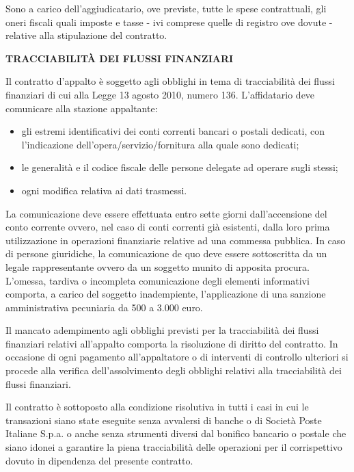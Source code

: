Sono a carico dell'aggiudicatario, ove previste, tutte le spese
contrattuali, gli oneri fiscali quali imposte e tasse - ivi comprese
quelle di registro ove dovute - relative alla stipulazione del contratto.

\textbf{TRACCIABILITÀ DEI FLUSSI FINANZIARI}

Il contratto d'appalto è soggetto agli obblighi in tema di
tracciabilità dei flussi finanziari di cui alla Legge 13 agosto 2010,
numero 136. L'affidatario deve comunicare alla stazione appaltante:

\begin{itemize}

\item gli estremi identificativi dei conti correnti bancari o postali
dedicati, con l'indicazione dell'opera/servizio/fornitura alla quale
sono dedicati;

\item le generalità e il codice fiscale delle persone delegate ad
operare sugli stessi;

\item ogni modifica relativa ai dati trasmessi. 
\end{itemize}

La comunicazione deve essere effettuata entro sette giorni dall'accensione
del conto corrente ovvero, nel caso di conti correnti già esistenti,
dalla loro prima utilizzazione in operazioni finanziarie relative ad
una commessa pubblica. In caso di persone giuridiche, la comunicazione
de quo deve essere sottoscritta da un legale rappresentante ovvero da
un soggetto munito di apposita procura. L'omessa, tardiva o incompleta
comunicazione degli elementi informativi comporta, a carico del soggetto
inadempiente, l'applicazione di una sanzione amministrativa pecuniaria
da 500 a 3.000 euro.

Il mancato adempimento agli obblighi previsti per la tracciabilità
dei flussi finanziari relativi all'appalto comporta la risoluzione di
diritto del contratto. In occasione di ogni pagamento all'appaltatore
o di interventi di controllo ulteriori si procede alla verifica
dell'assolvimento degli obblighi relativi alla tracciabilità dei
flussi finanziari.

Il contratto è sottoposto alla condizione risolutiva in tutti i casi
in cui le transazioni siano state eseguite senza avvalersi di banche
o di Società Poste Italiane S.p.a. o anche senza strumenti diversi
dal bonifico bancario o postale che siano idonei a garantire la piena
tracciabilità delle operazioni per il corrispettivo dovuto in dipendenza
del presente contratto.

